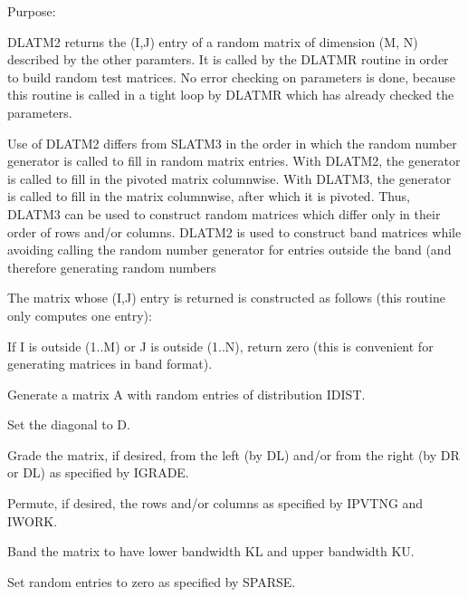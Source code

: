 \begin{DoxyParagraph}{Purpose\+: }
\begin{DoxyVerb}    DLATM2 returns the (I,J) entry of a random matrix of dimension
    (M, N) described by the other paramters. It is called by the
    DLATMR routine in order to build random test matrices. No error
    checking on parameters is done, because this routine is called in
    a tight loop by DLATMR which has already checked the parameters.

    Use of DLATM2 differs from SLATM3 in the order in which the random
    number generator is called to fill in random matrix entries.
    With DLATM2, the generator is called to fill in the pivoted matrix
    columnwise. With DLATM3, the generator is called to fill in the
    matrix columnwise, after which it is pivoted. Thus, DLATM3 can
    be used to construct random matrices which differ only in their
    order of rows and/or columns. DLATM2 is used to construct band
    matrices while avoiding calling the random number generator for
    entries outside the band (and therefore generating random numbers

    The matrix whose (I,J) entry is returned is constructed as
    follows (this routine only computes one entry):

      If I is outside (1..M) or J is outside (1..N), return zero
         (this is convenient for generating matrices in band format).

      Generate a matrix A with random entries of distribution IDIST.

      Set the diagonal to D.

      Grade the matrix, if desired, from the left (by DL) and/or
         from the right (by DR or DL) as specified by IGRADE.

      Permute, if desired, the rows and/or columns as specified by
         IPVTNG and IWORK.

      Band the matrix to have lower bandwidth KL and upper
         bandwidth KU.

      Set random entries to zero as specified by SPARSE.\end{DoxyVerb}
 
\end{DoxyParagraph}


